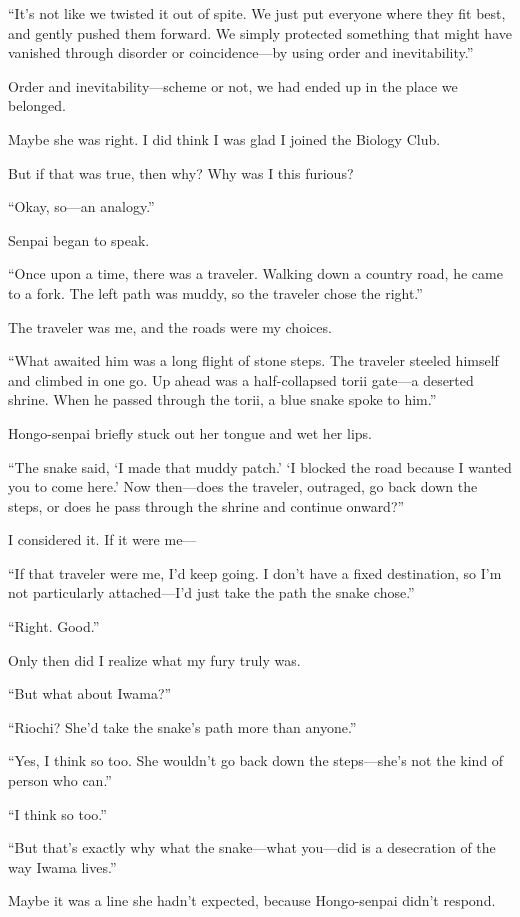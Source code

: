 \documentclass[
    a4paper,
    12pt,
    twoside,
    openany,
    UTF8,
    fontset=windows
]{ctexbook}
\begin{document}
``It's not like we twisted it out of spite. We just put everyone where they fit best, and gently pushed them forward. We simply protected something that might have vanished through disorder or coincidence---by using order and inevitability.''

Order and inevitability---scheme or not, we had ended up in the place we belonged.

Maybe she was right. I did think I was glad I joined the Biology Club.

But if that was true, then why? Why was I this furious?

``Okay, so---an analogy.''

Senpai began to speak.

``Once upon a time, there was a traveler. Walking down a country road, he came to a fork. The left path was muddy, so the traveler chose the right.''

The traveler was me, and the roads were my choices.

``What awaited him was a long flight of stone steps. The traveler steeled himself and climbed in one go. Up ahead was a half-collapsed torii gate---a deserted shrine. When he passed through the torii, a blue snake spoke to him.''

Hongo-senpai briefly stuck out her tongue and wet her lips.

``The snake said, `I made that muddy patch.' `I blocked the road because I wanted you to come here.' Now then---does the traveler, outraged, go back down the steps, or does he pass through the shrine and continue onward?''

I considered it. If it were me---

``If that traveler were me, I'd keep going. I don't have a fixed destination, so I'm not particularly attached---I'd just take the path the snake chose.''

``Right. Good.''

Only then did I realize what my fury truly was.

``But what about Iwama?''

``Riochi? She'd take the snake's path more than anyone.''

``Yes, I think so too. She wouldn't go back down the steps---she's not the kind of person who can.''

``I think so too.''

``But that's exactly why what the snake---what you---did is a desecration of the way Iwama lives.''

Maybe it was a line she hadn't expected, because Hongo-senpai didn't respond.
\end{document}

